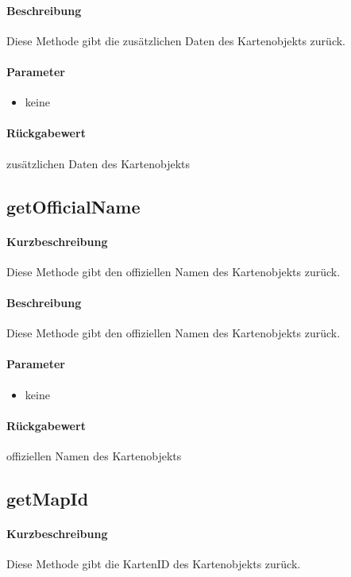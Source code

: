 \paragraph*{Beschreibung}
Diese Methode gibt die zusätzlichen Daten des Kartenobjekts zurück.
\paragraph*{Parameter}
\begin{itemize}
    \item keine
\end{itemize}
\paragraph*{Rückgabewert}
zusätzlichen Daten des Kartenobjekts

\subsection{getOfficialName}
\paragraph*{Kurzbeschreibung}
Diese Methode gibt den offiziellen Namen des Kartenobjekts zurück.
\paragraph*{Beschreibung}
Diese Methode gibt den offiziellen Namen des Kartenobjekts zurück.
\paragraph*{Parameter}
\begin{itemize}
    \item keine
\end{itemize}
\paragraph*{Rückgabewert}
offiziellen Namen des Kartenobjekts

\subsection{getMapId}
\paragraph*{Kurzbeschreibung}
Diese Methode gibt die KartenID des Kartenobjekts zurück.
